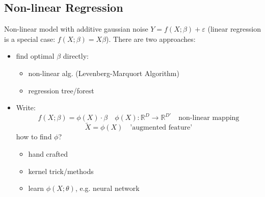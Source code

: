 \documentclass[11pt]{article}
\begin{document}
    \subsection{Non-linear Regression}
    Non-linear model with additive gaussian noise $Y=f(X;\beta)+\varepsilon$
    (linear regression is a special case: $f(X;\beta)=X\beta$). There are two approaches:
    \begin{itemize}
      \item find optimal $\beta$ directly:
      \begin{itemize}
        \item non-linear alg. (Levenberg-Marquort Algorithm)
        \item regression tree/forest
      \end{itemize}
      \item Write: \begin{equation*}
        f(X;\beta)=\phi(X) \cdot \beta \quad \phi(X): \mathbb{R}^D \to \mathbb{R}^{D'}
        \quad \text{non-linear mapping}
    \end{equation*}
    \begin{equation*}
      \tilde{X}=\phi(X) \quad \text{'augmented feature'}
    \end{equation*}
    how to find $\phi$?
    \begin{itemize}
      \item hand crafted
      \item kernel trick/methods
      \item learn $\phi(X;\theta)$, e.g. neural network
    \end{itemize}
    \end{itemize}
\end{document}
